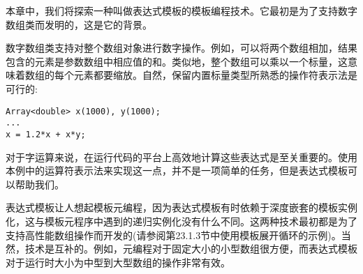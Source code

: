 本章中，我们将探索一种叫做表达式模板的模板编程技术。它最初是为了支持数字数组类而发明的，这是它的背景。

数字数组类支持对整个数组对象进行数字操作。例如，可以将两个数组相加，结果包含的元素是参数数组中相应值的和。类似地，整个数组可以乘以一个标量，这意味着数组的每个元素都要缩放。自然，保留内置标量类型所熟悉的操作符表示法是可行的:

\begin{lstlisting}[style=styleCXX]
Array<double> x(1000), y(1000);
...
x = 1.2*x + x*y;
\end{lstlisting}

对于字运算来说，在运行代码的平台上高效地计算这些表达式是至关重要的。使用本例中的运算符表示法来实现这一点，并不是一项简单的任务，但是表达式模板可以帮助我们。

表达式模板让人想起模板元编程，因为表达式模板有时依赖于深度嵌套的模板实例化，这与模板元程序中遇到的递归实例化没有什么不同。这两种技术最初都是为了支持高性能数组操作而开发的(请参阅第23.1.3节中使用模板展开循环的示例)。当然，技术是互补的。例如，元编程对于固定大小的小型数组很方便，而表达式模板对于运行时大小为中型到大型数组的操作非常有效。










































